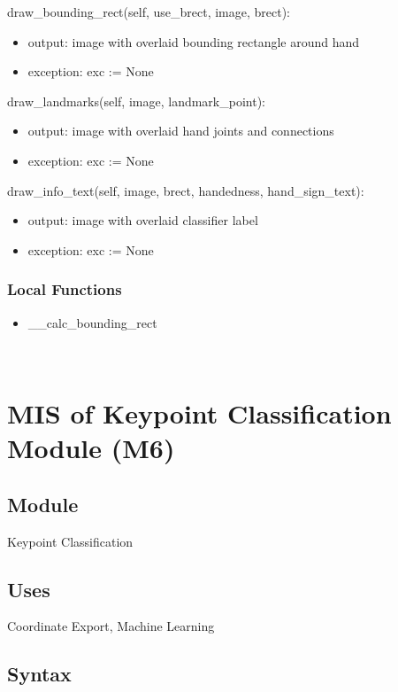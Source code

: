 \documentclass[12pt, titlepage]{article}
\begin{document}
\noindent draw\_bounding\_rect(self, use\_brect, image, brect):
\begin{itemize}
\item output: image with overlaid bounding rectangle around hand
\item exception: exc := None
\end{itemize}

\noindent draw\_landmarks(self, image, landmark\_point):
\begin{itemize}
\item output: image with overlaid hand joints and connections
\item exception: exc := None
\end{itemize}

\noindent draw\_info\_text(self, image, brect, handedness, hand\_sign\_text):
\begin{itemize}
\item output:  image with overlaid classifier label
\item exception: exc := None
\end{itemize}

\subsubsection{Local Functions}
\begin{itemize}
\item \_\_calc\_bounding\_rect
\end{itemize}

~\newpage

\section{MIS of Keypoint Classification Module (M6)} \label{M6}

\subsection{Module}

Keypoint Classification\\

\subsection{Uses}

Coordinate Export, Machine Learning\\

\subsection{Syntax}
\end{document}
